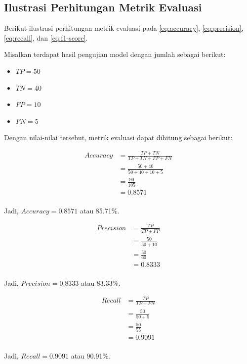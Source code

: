 \subsection{Ilustrasi Perhitungan Metrik Evaluasi} \label{subsec:ilustrasi_perhitungan_metrik_evaluasi}

Berikut ilustrasi perhitungan metrik evaluasi pada \ref{eq:accuracy}, \ref{eq:precision}, \ref{eq:recall}, dan \ref{eq:f1-score}.

Misalkan terdapat hasil pengujian model dengan jumlah sebagai berikut:
\begin{itemize}[noitemsep]
    \item \(TP = 50\)
    \item \(TN = 40\)
    \item \(FP = 10\)
    \item \(FN = 5\)
\end{itemize}
Dengan nilai-nilai tersebut, metrik evaluasi dapat dihitung sebagai berikut:

\begin{align*}
    \textit{Accuracy} &= \frac{TP + TN}{TP + TN + FP + FN} \\
    &= \frac{50 + 40}{50 + 40 + 10 + 5} \\
    &= \frac{90}{105} \\
    &= 0.8571\\
\end{align*}

Jadi, \(\textit{Accuracy} = 0.8571\) atau 85.71\%.

\begin{align*}
    \textit{Precision} &= \frac{TP}{TP + FP} \\
    &= \frac{50}{50 + 10} \\
    &= \frac{50}{60} \\
    &= 0.8333\\
\end{align*}

Jadi, \(\textit{Precision} = 0.8333\) atau 83.33\%.


\begin{align*}
    \textit{Recall} &= \frac{TP}{TP + FN} \\
    &= \frac{50}{50 + 5} \\
    &= \frac{50}{55} \\
    &= 0.9091\\
\end{align*}

Jadi, \(\textit{Recall} = 0.9091\) atau 90.91\%.


